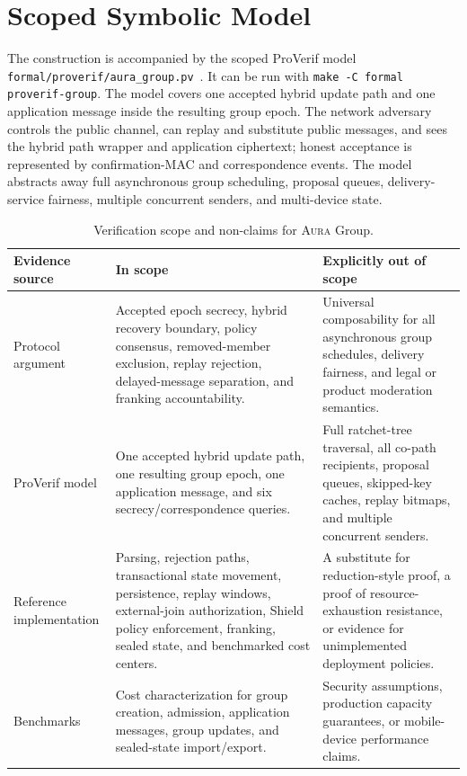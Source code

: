 \documentclass[preprint,12pt]{elsarticle}
\theoremstyle{definition}
\newcommand{\tech}[1]{\textnormal{#1}}
\newcommand{\Aura}{\textsc{Aura}}
\newcommand{\Shield}{\tech{Shield}}
\newcommand{\ProVerif}{\tech{ProVerif}}
\begin{document}
\section{Scoped Symbolic Model}

The construction is accompanied by the scoped \ProVerif{} model
\texttt{formal/proverif/aura\_group.pv}~\cite{blanchet2016}. It can be run
with \texttt{make -C formal proverif-group}. The model covers one accepted
hybrid update path and one application message inside the resulting group
epoch. The network adversary controls the public channel, can replay and
substitute public messages, and sees the hybrid path wrapper and application
ciphertext; honest acceptance is represented by confirmation-MAC and
correspondence events. The model abstracts away full asynchronous group
scheduling, proposal queues, delivery-service fairness, multiple concurrent
senders, and multi-device state.

\begin{table}[tbp]
\centering
\caption{Verification scope and non-claims for \Aura{} Group.}
\label{tab:group-verification-scope}
\footnotesize
\setlength{\tabcolsep}{2pt}
\begin{tabularx}{\textwidth}{@{}L{0.22\textwidth}L{0.36\textwidth}Y@{}}
\toprule
Evidence source & In scope & Explicitly out of scope \\
\midrule
Protocol argument & Accepted epoch secrecy, hybrid recovery boundary, policy consensus, removed-member exclusion, replay rejection, delayed-message separation, and franking accountability. & Universal composability for all asynchronous group schedules, delivery fairness, and legal or product moderation semantics. \\
\ProVerif{} model & One accepted hybrid update path, one resulting group epoch, one application message, and six secrecy/correspondence queries. & Full ratchet-tree traversal, all co-path recipients, proposal queues, skipped-key caches, replay bitmaps, and multiple concurrent senders. \\
Reference implementation & Parsing, rejection paths, transactional state movement, persistence, replay windows, external-join authorization, \Shield{} policy enforcement, franking, sealed state, and benchmarked cost centers. & A substitute for reduction-style proof, a proof of resource-exhaustion resistance, or evidence for unimplemented deployment policies. \\
Benchmarks & Cost characterization for group creation, admission, application messages, group updates, and sealed-state import/export. & Security assumptions, production capacity guarantees, or mobile-device performance claims. \\
\bottomrule
\end{tabularx}
\end{table}
\end{document}
